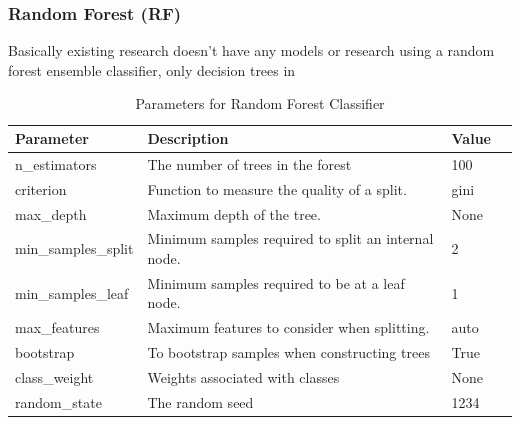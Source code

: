 
\subsubsection{Random Forest (RF)}
\label{sec:RF}

Basically existing research doesn't have any models or research using a random forest ensemble classifier, only decision trees in \parencite{9360747}



\begin{table}[h]
\centering
\caption{Parameters for Random Forest Classifier}
\label{tab:rf-params}
\begin{tabular}{|l|l|l|l|}
\hline
\textbf{Parameter} & \textbf{Description} & \textbf{Value}  \\ \hline
n\_estimators & The number of trees in the forest & 100\\
criterion & Function to measure the quality of a split. & gini\\
max\_depth & Maximum depth of the tree. &  None \\
min\_samples\_split & Minimum samples required to split an internal node. & 2 \\ 
min\_samples\_leaf & Minimum samples required to be at a leaf node. & 1 \\
max\_features & Maximum features to consider when splitting.  & auto \\
bootstrap & To bootstrap samples when constructing trees & True \\
class\_weight & Weights associated with classes & None  \\
random\_state & The random seed & 1234 \\ \hline
\end{tabular}
\end{table}



